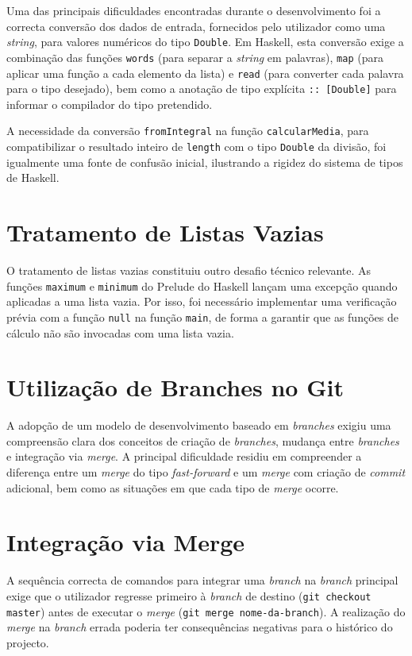 \documentclass[12pt, a4paper, oneside]{report}
\begin{document}
Uma das principais dificuldades encontradas durante o desenvolvimento foi a correcta conversão dos dados de entrada, fornecidos pelo utilizador como uma \textit{string}, para valores numéricos do tipo \texttt{Double}. Em Haskell, esta conversão exige a combinação das funções \texttt{words} (para separar a \textit{string} em palavras), \texttt{map} (para aplicar uma função a cada elemento da lista) e \texttt{read} (para converter cada palavra para o tipo desejado), bem como a anotação de tipo explícita \texttt{:: [Double]} para informar o compilador do tipo pretendido.

A necessidade da conversão \texttt{fromIntegral} na função \texttt{calcularMedia}, para compatibilizar o resultado inteiro de \texttt{length} com o tipo \texttt{Double} da divisão, foi igualmente uma fonte de confusão inicial, ilustrando a rigidez do sistema de tipos de Haskell.

\section{Tratamento de Listas Vazias}

O tratamento de listas vazias constituiu outro desafio técnico relevante. As funções \texttt{maximum} e \texttt{minimum} do Prelude do Haskell lançam uma excepção quando aplicadas a uma lista vazia. Por isso, foi necessário implementar uma verificação prévia com a função \texttt{null} na função \texttt{main}, de forma a garantir que as funções de cálculo não são invocadas com uma lista vazia.

\section{Utilização de Branches no Git}

A adopção de um modelo de desenvolvimento baseado em \textit{branches} exigiu uma compreensão clara dos conceitos de criação de \textit{branches}, mudança entre \textit{branches} e integração via \textit{merge}. A principal dificuldade residiu em compreender a diferença entre um \textit{merge} do tipo \textit{fast-forward} e um \textit{merge} com criação de \textit{commit} adicional, bem como as situações em que cada tipo de \textit{merge} ocorre.

\section{Integração via Merge}

A sequência correcta de comandos para integrar uma \textit{branch} na \textit{branch} principal exige que o utilizador regresse primeiro à \textit{branch} de destino (\texttt{git checkout master}) antes de executar o \textit{merge} (\texttt{git merge nome-da-branch}). A realização do \textit{merge} na \textit{branch} errada poderia ter consequências negativas para o histórico do projecto.
\end{document}
